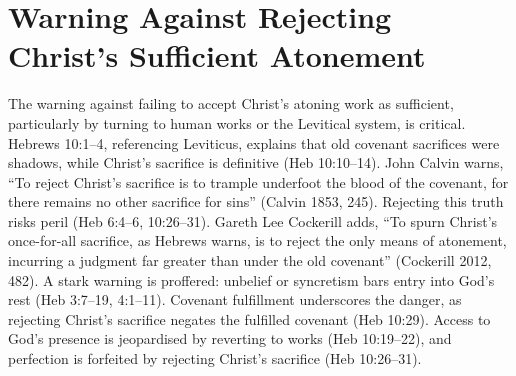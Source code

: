 \documentclass[12pt]{article}
\begin{document}
\section{Warning Against Rejecting Christ’s Sufficient Atonement}
The warning against failing to accept Christ’s atoning work as sufficient,
particularly by turning to human works or the Levitical system, is critical.
Hebrews 10:1--4, referencing Leviticus, explains that old covenant sacrifices
were shadows, while Christ’s sacrifice is definitive (Heb 10:10--14). John
Calvin warns, ``To reject Christ’s sacrifice is to trample underfoot the blood
of the covenant, for there remains no other sacrifice for sins'' (Calvin 1853,
245). Rejecting this truth risks peril (Heb 6:4--6, 10:26--31). Gareth Lee
Cockerill adds, ``To spurn Christ’s once-for-all sacrifice, as Hebrews warns,
is to reject the only means of atonement, incurring a judgment far greater than
under the old covenant'' (Cockerill 2012, 482). A stark warning is proffered:
unbelief or syncretism bars entry into God’s rest (Heb 3:7--19, 4:1--11).
Covenant fulfillment underscores the danger, as rejecting Christ’s sacrifice
negates the fulfilled covenant (Heb 10:29). Access to God’s presence is
jeopardised by reverting to works (Heb 10:19--22), and perfection is forfeited
by rejecting Christ’s sacrifice (Heb 10:26--31).
\end{document}
